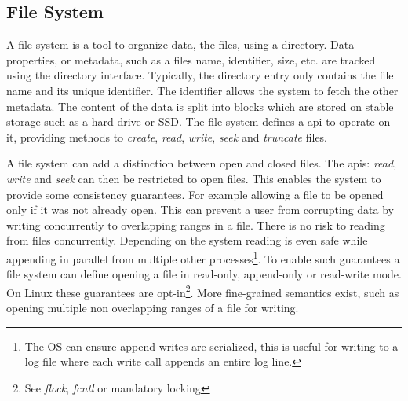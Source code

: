 \subsection{File System}
A file system is a tool to organize data, the files, using a directory. Data properties, or metadata, such as a files name, identifier, size, etc. are tracked using the directory interface. Typically, the directory entry only contains the file name and its unique identifier. The identifier allows the system to fetch the other metadata. The content of the data is split into blocks which are stored on stable storage such as a hard drive or SSD. The file system defines a \ac{api} to operate on it, providing methods to \textit{create}, \textit{read}, \textit{write}, \textit{seek} and \textit{truncate} files. 

A file system can add a distinction between open and closed files. The \acp{api}: \textit{read}, \textit{write} and \textit{seek} can then be restricted to open files. This enables the system to provide some consistency guarantees. For example allowing a file to be opened only if it was not already open. This can prevent a user from corrupting data by writing concurrently to overlapping ranges in a file. There is no risk to reading from files concurrently. Depending on the system reading is even safe while appending in parallel from multiple other processes\footnote{The OS can ensure append writes are serialized, this is useful for writing to a log file where each write call appends an entire log line.}. To enable such guarantees a file system can define opening a file in read-only, append-only or read-write mode. On Linux these guarantees are opt-in\footnote{See \textsl{flock}, \textsl{fcntl} or mandatory locking}. More fine-grained semantics exist, such as opening multiple non overlapping ranges of a file for writing. 

